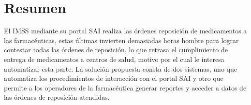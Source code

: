 \section{Resumen}
El IMSS mediante su portal SAI realiza las órdenes reposición de medicamentos a las farmacéuticas, estas últimas invierten demasiadas horas hombre para lograr contestar todas las órdenes de reposición, lo que retrasa el cumplimiento de entrega de medicamentos a centros de salud, motivo por el cual le interesa automatizar esta parte. La solución propuesta consta de dos sistemas, uno que automatiza los procedimientos de interacción con el portal SAI y otro que permite a los operadores de la farmacéutica generar reportes y acceder a datos de las órdenes de reposición atendidas.
